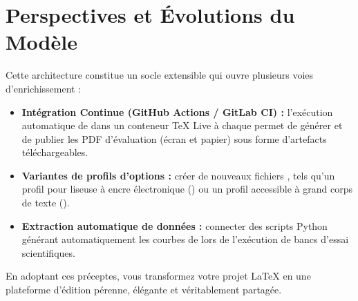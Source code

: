 \section{Perspectives et Évolutions du Modèle}
\label{sec:conclusion-perspectives}

Cette architecture constitue un socle extensible qui ouvre plusieurs voies d'enrichissement :

\begin{itemize}
  \item \textbf{Intégration Continue (GitHub Actions / GitLab CI) :}
  l'exécution automatique de  dans un conteneur TeX Live à chaque 
  permet de générer et de publier les PDF d'évaluation (écran et papier) sous forme d'artefacts téléchargeables.
  \item \textbf{Variantes de profils d'options :}
  créer de nouveaux fichiers , tels qu'un profil pour liseuse à encre électronique ()
  ou un profil accessible à grand corps de texte ().
  \item \textbf{Extraction automatique de données :}
  connecter des scripts Python générant automatiquement les courbes de 
  lors de l'exécution de bancs d'essai scientifiques.
\end{itemize}

En adoptant ces préceptes, vous transformez votre projet \LaTeX{} en une plateforme d'édition pérenne,
élégante et véritablement partagée.

